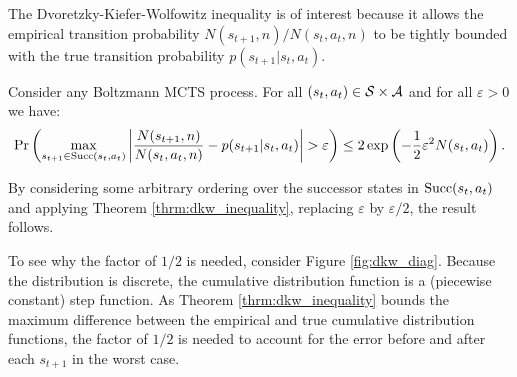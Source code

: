             The Dvoretzky-Kiefer-Wolfowitz inequality is of interest because it allows the empirical transition probability $N(s_{t+1},n)/N(s_t,a_t,n)$ to be tightly bounded with the true transition probability $p(s_{t+1}|s_t,a_t)$. 
            \begin{corollary} \label{cor:bound_transition_distribution}
                Consider any Boltzmann MCTS process. For all $(s_t,a_t)\in\mathcal{S}\times\mathcal{A}$ and for all $\varepsilon >0$ we have:
                \begin{align}
                    \Pr\left(\max_{s_{t+1}\in{\textnormal{Succ}(s_t,a_t)}}\left| \frac{N(s_{t+1},n)}{N(s_t,a_t,n)} - p(s_{t+1}|s_t,a_t) \right| > \varepsilon \right) \leq 2 \exp\left(-\frac{1}{2}\varepsilon^2 N(s_t,a_t) \right).
                \end{align}
            \end{corollary}
            \begin{proofoutline}
                By considering some arbitrary ordering over the successor states in ${\textnormal{Succ}(s_t,a_t)}$ and applying Theorem \ref{thrm:dkw_inequality}, replacing $\varepsilon$ by $\varepsilon/2$, the result follows.

                To see why the factor of $1/2$ is needed, consider Figure \ref{fig:dkw_diag}. Because the distribution is discrete, the cumulative distribution function is a (piecewise constant) step function. As Theorem \ref{thrm:dkw_inequality} bounds the maximum difference between the empirical and true cumulative distribution functions, the factor of $1/2$ is needed to account for the error before and after each $s_{t+1}$ in the worst case.
            \end{proofoutline}









